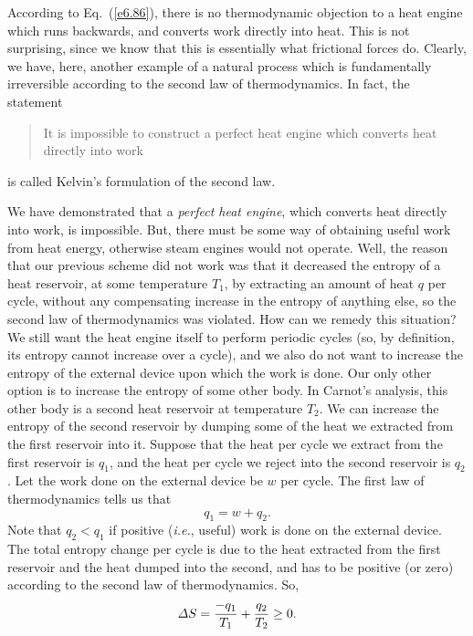 According to Eq.~(\ref{e6.86}), there is no thermodynamic objection to
a heat engine which runs backwards, and converts work directly into heat. This
is not surprising, since we know that this is essentially what frictional  forces
do. Clearly, we have, here, another example of a natural process which is 
fundamentally irreversible according to the second law of thermodynamics. 
In fact, the statement
\begin{quote}
{\sf It is impossible to construct a perfect heat engine which  converts
heat directly into work}
\end{quote}
 is called Kelvin's formulation of the second law. 

We have demonstrated that a {\em perfect heat engine}, which converts 
heat directly into work, is impossible. But, there must be some way of
obtaining useful work from heat energy, otherwise steam engines would not operate.
 Well, the reason that our
previous scheme did not work was that it decreased the entropy of a heat reservoir,
at some temperature $T_1$, 
by extracting an amount of heat $q$ per cycle, 
without any compensating increase in the entropy of anything else, so the
second law of thermodynamics was violated. How can we remedy this situation?
 We still want
the heat engine itself to perform periodic cycles (so,
by definition, its entropy cannot increase over a
cycle), and we also  do not
 want to increase the entropy of the external device upon which the
work is done. Our only other option is to increase the entropy of some other
body. In Carnot's analysis, this other body is
 a second heat reservoir at temperature $T_2$. We can increase the entropy
of the second reservoir by dumping  some of the heat we extracted from the
first reservoir into it. Suppose that the heat per cycle  we extract from the first
reservoir 
is $q_1$, and the heat per cycle we reject  into the second reservoir 
 is $q_2$. Let the
work done on the external device be $w$ per cycle. The first law of thermodynamics
tells us that 
\begin{equation}
q_1 = w + q_2.
\end{equation}
Note that $q_2 < q_1$ if positive ({\em i.e.}, useful) work is done on the 
external  device.
The total entropy change per cycle is due to the heat extracted from the first
reservoir and the heat dumped into the second, and has to be positive (or zero)
according to the second law of thermodynamics. So, 
\begin{equation}
{\mit\Delta} S = \frac{-q_1}{T_1} + \frac{q_2}{T_2} \geq 0.
\end{equation}
